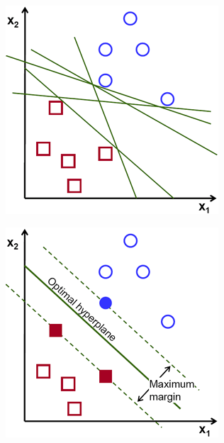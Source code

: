 \documentclass[a4paper,12pt]{report}
\begin{document}
\begin{center}
    \captionsetup{type=figure}
    \begin{minipage}[c]{.45\linewidth}
        \centering
        \includegraphics[width=1\linewidth]{media/emptysquare.png}
    \end{minipage}
    \begin{minipage}[c]{.45\linewidth}
        \centering
        \includegraphics[width=1\linewidth]{media/fullsquare.png}
    \end{minipage}
\end{center}
\end{document}

